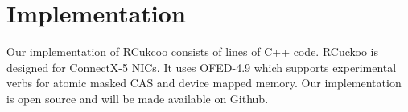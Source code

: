 \section{Implementation}

Our implementation of RCukcoo consists of  lines of
C++ code. RCuckoo is designed for ConnectX-5 NICs. It uses
OFED-4.9 which supports experimental verbs for atomic masked
CAS and device mapped memory. Our implementation is open
source and will be made available on Github.